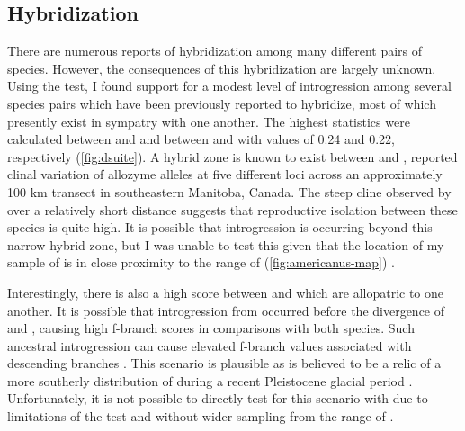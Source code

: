 \subsection{Hybridization}
There are numerous reports of hybridization among many different pairs of 
\anaxyrus species. 
However, the consequences of this hybridization are largely unknown. 
Using the \fbranch test, I found support for a modest level of introgression 
among several species pairs which have been previously reported to hybridize, 
most of which presently exist in sympatry with one another.
The highest \fbranch statistics were calculated between \amer and \hemiophrys and 
between \amer and \baxteri with values of 0.24 and 0.22, respectively (\cref{fig:dsuite}).
A hybrid zone is known to exist between \amer and \hemiophrys,
\textcite{green1983} reported clinal variation of allozyme alleles at five different 
loci across an approximately 100 km transect in southeastern Manitoba, Canada.
The steep cline observed by \textcite{green1983} over a relatively short distance suggests that reproductive 
isolation between these species is quite high. 
It is possible that introgression is occurring beyond this narrow hybrid zone,
but I was unable to test this given that the location of my sample of \hemiophrys  
is in close proximity to the range of \amer (\cref{fig:americanus-map}) \parencite{conant1998}. 

Interestingly, there is also a high \fbranch score between \amer and \baxteri
which are allopatric to one another. 
It is possible that introgression from \amer occurred before the divergence  
of \hemiophrys and \baxteri, causing high f-branch scores in comparisons with both species.
Such ancestral introgression can cause elevated f-branch values associated with 
descending branches \parencite{malinsky2021}.
This scenario is plausible as \baxteri is believed to be a relic of a more 
southerly distribution of \hemiophrys during a recent Pleistocene glacial period 
\parencite{henrich1968}.
Unfortunately, it is not possible to directly test for this scenario with \dsuite
due to limitations of the \fbranch test and without wider sampling from the range 
of \hemiophrys \parencite{malinsky2021}.

